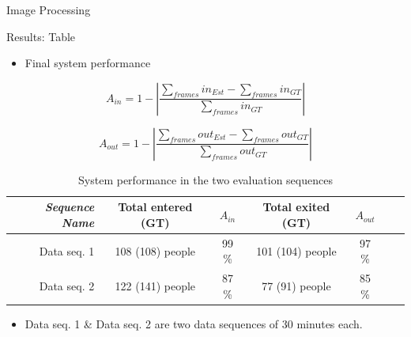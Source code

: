 \documentclass[final,hyperref={pdfpagelabels=false}]{beamer}
\begin{document}
\begin{frame}[t]
\begin{columns}[t]
\begin{column}{.465\textwidth}
\begin{block}{Image Processing}
\begin{itemize}
\end{itemize}
\end{block}






\begin{block}{Results: Table}

\begin{itemize}
\item Final system performance
\end{itemize}

\begin{equation}
\label{eq:in_accuracy}
A_{in} = 1 - |\frac{\sum_{frames}{in_{Est}}-\sum_{frames}{in_{GT}}}{\sum_{frames}in_{GT}}|
\end{equation} 

\begin{equation}
\label{eq:out_accuracy}
A_{out} = 1 - |\frac{\sum_{frames}{out_{Est}}-\sum_{frames}out_{GT}}{\sum_{frames}out_{GT}}| 
\end{equation} 


\begin{table}[h]
\centering
	\begin{tabular}{r | c | c | c | c | c | c }
		\emph{Sequence Name}		&  Total entered (GT) & \emph{$A_{in}$} & Total exited (GT) & \emph{$A_{out}$} \\
		\hline \hline
		Data seq. 1			& 108 (108) people & 99 \% & 101 (104) people & 97 \% \\
		Data seq. 2			& 122 (141) people & 87 \% & 77 (91) people & 85 \%  \\
		\end{tabular}
	\caption{System performance in the two evaluation sequences}
\end{table}

\begin{itemize}
\item Data seq. 1 \& Data seq. 2 are two data sequences of 30 minutes each. 
\end{itemize}
     
\end{block}



\end{column}
\end{columns}
\end{frame}
\end{document}
